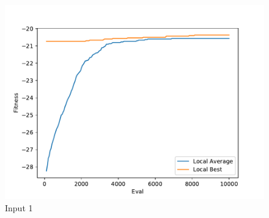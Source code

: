 \documentclass{standalone}
\begin{document}
\begin{figure}[!htb]
	\caption{Input 1}
	\label{fig:graph_1057}
	\includegraphics[width=\textwidth]{../graphs/graphs/1057.pdf}
\end{figure}
\end{document}
